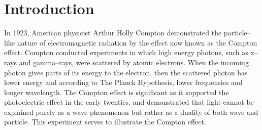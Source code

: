 \section{Introduction} 
In 1923, American physicist Arthur Holly Compton demonstrated the particle–like
nature of electromagnetic radiation by the effect now known as the Compton
effect. Compton conducted experiments in which high energy photons, such as
x–rays and gamma–rays, were scattered by atomic electrons. When the incoming
photon gives parts of its energy to the electron, then the scattered photon has
lower energy and according to The Planck Hypothesis, lower frequensies and
longer wavelength. The Compton effect is significant as it supported the
photoelectric effect in the early twenties, and demonstrated that light cannot
be explained purely as a wave phenomenon but rather as a duality of both wave
and particle.  This experiment serves to illustrate the Compton effect. 
